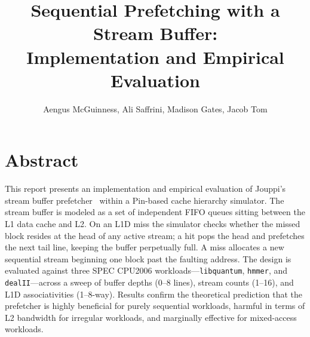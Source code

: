 \documentclass[11pt,letterpaper]{article}
\title{\textbf{Sequential Prefetching with a Stream Buffer:\\
Implementation and Empirical Evaluation}}
\author{Aengus McGuinness, Ali Saffrini, Madison Gates, Jacob Tom}
\date{}
\begin{document}
\maketitle

\section*{Abstract}

This report presents an implementation and empirical evaluation of Jouppi's
stream buffer prefetcher~\cite{jouppi1990improving} within a Pin-based cache
hierarchy simulator. The stream buffer is modeled as a set of independent
FIFO queues sitting between the L1 data cache and L2. On an L1D miss the
simulator checks whether the missed block resides at the head of any active
stream; a hit pops the head and prefetches the next tail line, keeping the
buffer perpetually full. A miss allocates a new sequential stream beginning
one block past the faulting address. The design is evaluated against three
SPEC CPU2006 workloads---\texttt{libquantum}, \texttt{hmmer}, and
\texttt{dealII}---across a sweep of buffer depths (0--8 lines), stream counts
(1--16), and L1D associativities (1--8-way). Results confirm the theoretical
prediction that the prefetcher is highly beneficial for purely sequential
workloads, harmful in terms of L2 bandwidth for irregular workloads, and
marginally effective for mixed-access workloads.



\end{document}
